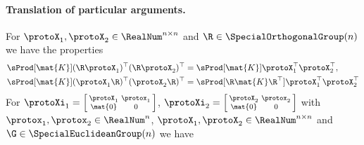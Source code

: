 \paragraph{Translation of particular arguments.}
For $\protoX_1, \protoX_2 \in \RealNum^{n\times n}$ and $\R \in \SpecialOrthogonalGroup(n)$ we have the properties
\begin{subequations}
\begin{align}
 \sProd[\mat{K}]{(\R \protoX_1)^\top}{(\R \protoX_2)^\top}
 &= \sProd[\mat{K}]{\protoX_1^\top}{\protoX_2^\top},
\\
 \sProd[\mat{K}]{(\protoX_1 \R)^\top}{(\protoX_2 \R)^\top} 
 &= \sProd[\R \mat{K} \R^\top]{\protoX_1^\top}{\protoX_2^\top}
\end{align} 
\end{subequations}
For $\protoXi_1 = \left[\begin{smallmatrix} \protoX_1 & \protox_1 \\ \mat{0} & 0 \end{smallmatrix}\right]$, $\protoXi_2 = \left[\begin{smallmatrix} \protoX_2 & \protox_2 \\ \mat{0} & 0 \end{smallmatrix}\right]$ with $\protox_1, \protox_2 \in \RealNum^{n}$, $\protoX_1, \protoX_2 \in \RealNum^{n\times n}$ and $\G \in \SpecialEuclideanGroup(n)$ we have
